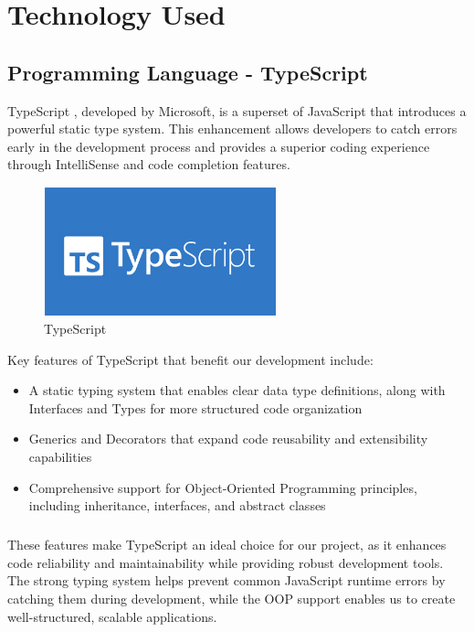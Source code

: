 \chapter{Technology Used}  %
\section{Programming Language - TypeScript}
TypeScript \cite{microsoft2024typescript}, developed by Microsoft, is a superset of JavaScript that introduces a powerful static type system. This enhancement allows developers to catch errors early in the development process and provides a superior coding experience through IntelliSense and code completion features.

\begin{figure}[H]
    \centering
    \includegraphics[width=0.6\textwidth]{root/typescript.png}
    \caption{TypeScript}
\end{figure}

Key features of TypeScript that benefit our development include:
\begin{itemize}
    \item A static typing system that enables clear data type definitions, along with Interfaces and Types for more structured code organization
    \item Generics and Decorators that expand code reusability and extensibility capabilities
    \item Comprehensive support for Object-Oriented Programming principles, including inheritance, interfaces, and abstract classes
\end{itemize}
\paragraph{}These features make TypeScript an ideal choice for our project, as it enhances code reliability and maintainability while providing robust development tools. The strong typing system helps prevent common JavaScript runtime errors by catching them during development, while the OOP support enables us to create well-structured, scalable applications.


